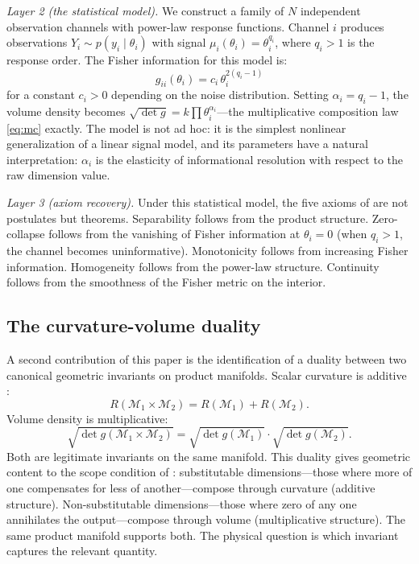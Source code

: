 \documentclass[12pt, a4paper]{article}
\theoremstyle{definition}
\theoremstyle{remark}
\begin{document}
\textit{Layer 2 (the statistical model).} We construct a family of $N$ independent observation channels with power-law response functions. Channel $i$ produces observations $Y_i \sim p(y_i \mid \theta_i)$ with signal $\mu_i(\theta_i) = \theta_i^{q_i}$, where $q_i > 1$ is the response order. The Fisher information for this model is:
\[
g_{ii}(\theta_i) = c_i \, \theta_i^{2(q_i - 1)}
\]
for a constant $c_i > 0$ depending on the noise distribution. Setting $\alpha_i = q_i - 1$, the volume density becomes $\sqrt{\det g} = k \prod \theta_i^{\alpha_i}$---the multiplicative composition law \eqref{eq:mc} exactly. The model is not ad hoc: it is the simplest nonlinear generalization of a linear signal model, and its parameters have a natural interpretation: $\alpha_i$ is the elasticity of informational resolution with respect to the raw dimension value.

\textit{Layer 3 (axiom recovery).} Under this statistical model, the five axioms of \cite{kirsch2026mc} are not postulates but theorems. Separability follows from the product structure. Zero-collapse follows from the vanishing of Fisher information at $\theta_i = 0$ (when $q_i > 1$, the channel becomes uninformative). Monotonicity follows from increasing Fisher information. Homogeneity follows from the power-law structure. Continuity follows from the smoothness of the Fisher metric on the interior.

\subsection{The curvature-volume duality}

A second contribution of this paper is the identification of a duality between two canonical geometric invariants on product manifolds. Scalar curvature is additive \cite{wikiscalar}:
\[
R(\mathcal{M}_1 \times \mathcal{M}_2) = R(\mathcal{M}_1) + R(\mathcal{M}_2).
\]
Volume density is multiplicative:
\[
\sqrt{\det g(\mathcal{M}_1 \times \mathcal{M}_2)} = \sqrt{\det g(\mathcal{M}_1)} \cdot \sqrt{\det g(\mathcal{M}_2)}.
\]
Both are legitimate invariants on the same manifold. This duality gives geometric content to the scope condition of \cite{kirsch2026mc}: substitutable dimensions---those where more of one compensates for less of another---compose through curvature (additive structure). Non-substitutable dimensions---those where zero of any one annihilates the output---compose through volume (multiplicative structure). The same product manifold supports both. The physical question is which invariant captures the relevant quantity.
\end{document}
